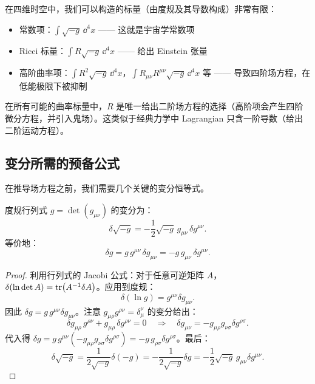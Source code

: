 \begin{note}
在四维时空中，我们可以构造的标量（由度规及其导数构成）非常有限：
\begin{itemize}
    \item 常数项：$\int \sqrt{-g}\,\dd^4 x$ —— 这就是宇宙学常数项
    \item Ricci 标量：$\int R\sqrt{-g}\,\dd^4 x$ —— 给出 Einstein 张量
    \item 高阶曲率项：$\int R^2\sqrt{-g}\,\dd^4 x$，$\int R_{\mu\nu}R^{\mu\nu}\sqrt{-g}\,\dd^4 x$ 等 —— 导致四阶场方程，在低能极限下被抑制
\end{itemize}
在所有可能的曲率标量中，$R$ 是唯一给出二阶场方程的选择（高阶项会产生四阶微分方程，并引入鬼场）。这类似于经典力学中 Lagrangian 只含一阶导数（给出二阶运动方程）。
\end{note}

\subsection{变分所需的预备公式}

在推导场方程之前，我们需要几个关键的变分恒等式。

\begin{property}[度规行列式的变分]
度规行列式 $g = \det(g_{\mu\nu})$ 的变分为：
\begin{equation}
    \boxed{\delta \sqrt{-g} = -\frac{1}{2} \sqrt{-g} \, g_{\mu\nu} \, \delta g^{\mu\nu}}.
    \label{eq:delta_sqrtg}
\end{equation}
等价地：
\begin{equation}
    \delta g = g \, g^{\mu\nu} \, \delta g_{\mu\nu} = -g \, g_{\mu\nu} \, \delta g^{\mu\nu}.
\end{equation}
\end{property}

\begin{proof}
利用行列式的 Jacobi 公式：对于任意可逆矩阵 $A$，$\delta(\ln\det A) = \tr(A^{-1}\delta A)$。应用到度规：
\begin{equation}
    \delta(\ln g) = g^{\mu\nu} \delta g_{\mu\nu}.
\end{equation}
因此 $\delta g = g \, g^{\mu\nu} \delta g_{\mu\nu}$。注意 $g_{\mu\rho} g^{\rho\nu} = \delta_\mu^\nu$ 的变分给出：
\begin{equation}
    \delta g_{\mu\rho} \, g^{\rho\nu} + g_{\mu\rho} \, \delta g^{\rho\nu} = 0
    \quad\Longrightarrow\quad
    \delta g_{\mu\nu} = -g_{\mu\rho} g_{\nu\sigma} \delta g^{\rho\sigma}.
\end{equation}
代入得 $\delta g = g \, g^{\mu\nu}(-g_{\mu\rho}g_{\nu\sigma}\delta g^{\rho\sigma}) = -g \, g_{\rho\sigma} \delta g^{\rho\sigma}$。最后：
\begin{equation}
    \delta\sqrt{-g} = \frac{1}{2\sqrt{-g}}\delta(-g) = -\frac{1}{2\sqrt{-g}} \delta g
    = -\frac{1}{2}\sqrt{-g} \, g_{\mu\nu} \delta g^{\mu\nu}.
\end{equation}
\end{proof}

